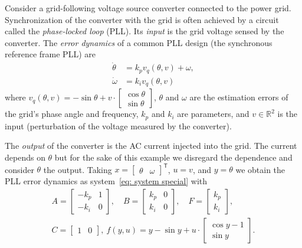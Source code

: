 \documentclass[letterpaper, 10 pt, conference]{ieeeconf}
\newcommand{\trans}{^\mathsf{T}}
\newcommand{\bbR}{\mathbb{R}}
\begin{document}
Consider a grid-following voltage source converter connected to the power grid. Synchronization of the converter with the grid is often achieved by a circuit called the \emph{phase-locked loop} (PLL). Its \emph{input} is the grid voltage sensed by the converter. The \emph{error dynamics} of a common PLL design (the synchronous reference frame PLL) are~\cite{escobarNonlinearStabilityAnalysis2021}
\begin{subequations}
    \label{eq: system example}
    \begin{align}
        \dot\theta &= k_p v_q(\theta, v) + \omega, \\
        \dot\omega &= k_i v_q(\theta, v)
    \end{align}
\end{subequations}
where
$
    v_q(\theta, v) = -\sin\theta + v \cdot \begin{bmatrix}
        \cos\theta \\ \sin\theta
    \end{bmatrix}
$,
$\theta$ and $\omega$ are the estimation errors of the grid's phase angle and frequency, $k_p$ and $k_i$ are parameters, and $v \in \bbR^2$ is the input (perturbation of the voltage measured by the converter).

The \emph{output} of the converter is the AC current injected into the grid. The current depends on $\theta$ but for the sake of this example we disregard the dependence and consider $\theta$ the output. Taking
$
    x = \begin{bmatrix}
        \theta & \omega
    \end{bmatrix}\trans
$,
$u = v$, and $y = \theta$ we obtain the PLL error dynamics as system~\eqref{eq: system special} with
\begin{subequations}
    \begin{gather}
        A = \begin{bmatrix}
            -k_p & 1 \\
            -k_i & 0
        \end{bmatrix}, \quad
        B = \begin{bmatrix}
            k_p & 0 \\
            k_i & 0
        \end{bmatrix}, \quad
        F = \begin{bmatrix}
            k_p \\ k_i
        \end{bmatrix}, \\
        C = \begin{bmatrix}
            1 & 0
        \end{bmatrix}\!,\:
        f(y,u) = y - \sin y + u \cdot \begin{bmatrix}
            \cos y - 1 \\
            \sin y
        \end{bmatrix}.
    \end{gather}
\end{subequations}
\end{document}
